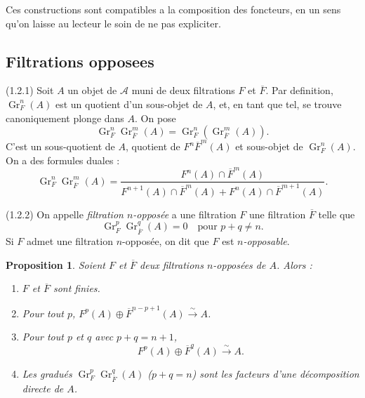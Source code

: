 \documentclass[11pt,a4paper]{amsart}
\theoremstyle{plain}
\newtheorem{proposition}[theorem]{Proposition}
\theoremstyle{definition}
\theoremstyle{remark}
\DeclareMathOperator{\Gr}{Gr}
\newcommand{\sA}{\mathscr{A}}
\numberwithin{equation}{subsection}
\begin{document}
Ces constructions sont compatibles a la composition des foncteurs, en un sens
qu'on laisse au lecteur le soin de ne pas expliciter.


\subsection{Filtrations opposees}

(1.2.1) Soit $A$ un objet de $\sA$ muni de deux filtrations $F$ et $\overline{F}$. Par definition,
$\Gr_F^n(A)$ est un quotient d'un sous-objet de $A$, et, en tant que tel, se trouve
canoniquement plonge dans $A$. On pose
\[
\Gr_F^n \Gr_{\overline{F}}^m(A) = \Gr_F^n(\Gr_{\overline{F}}^m(A)).
\]
C'est un sous-quotient de $A$, quotient de $F^n \overline{F}^m(A)$ et sous-objet de
$\Gr_F^n(A)$. On a des formules duales :
\[
\Gr_F^n \Gr_{\overline{F}}^m(A) = \frac{F^n(A) \cap \overline{F}^m(A)}{F^{n+1}(A) \cap \overline{F}^m(A) + F^n(A) \cap \overline{F}^{m+1}(A)}.
\]

(1.2.2) On appelle \emph{filtration $n$-oppos\'ee} a une filtration $F$ une filtration
$\overline{F}$ telle que
\[
\Gr_F^p \Gr_{\overline{F}}^q(A) = 0 \quad \text{pour } p+q \neq n.
\]
Si $F$ admet une filtration $n$-oppos\'ee, on dit que $F$ est \emph{$n$-opposable}.

\begin{proposition}\label{prop:1.2.3}
Soient $F$ et $\overline{F}$ deux filtrations $n$-oppos\'ees de $A$. Alors :
\begin{enumerate}
\item[(i)] $F$ et $\overline{F}$ sont finies.
\item[(ii)] Pour tout $p$, $F^p(A) \oplus \overline{F}^{n-p+1}(A) \xrightarrow{\sim} A$.
\item[(iii)] Pour tout $p$ et $q$ avec $p+q = n+1$,
\[
F^p(A) \oplus \overline{F}^q(A) \xrightarrow{\sim} A.
\]
\item[(iv)] Les gradu\'es $\Gr_F^p \Gr_{\overline{F}}^q(A)$ ($p+q=n$) sont les facteurs d'une d\'ecomposition
directe de $A$.
\end{enumerate}
\end{proposition}
\end{document}
